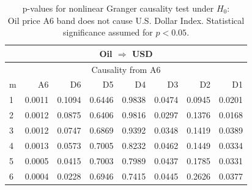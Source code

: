 %
%
\begin{table}[H]
\begin{center}
\begin{tabular}{l|r r r r r r r}
\hline\hline
\multicolumn{8}{c}{Oil $\Rightarrow$ USD}\\
\hline
\multicolumn{8}{c}{Causality from A6}\\
\hline\hline
m & A6 & D6 & D5 & D4 & D3 & D2 & D1 \\
\hline
1 & \cellcolor{mygrey}0.0011 & 0.1094 & 0.6446 & 0.9838 & \cellcolor{mygrey}0.0474 & 0.0945 & \cellcolor{mygrey}0.0201 \\
2 & \cellcolor{mygrey}0.0012 & 0.0875 & 0.6406 & 0.9816 & \cellcolor{mygrey}0.0297 & 0.1376 & \cellcolor{mygrey}0.0168 \\
3 & \cellcolor{mygrey}0.0012 & 0.0747 & 0.6869 & 0.9392 & \cellcolor{mygrey}0.0348 & 0.1419 & \cellcolor{mygrey}0.0389 \\
4 & \cellcolor{mygrey}0.0013 & 0.0573 & 0.7005 & 0.8232 & \cellcolor{mygrey}0.0462 & 0.1449 & \cellcolor{mygrey}0.0334 \\
5 & \cellcolor{mygrey}0.0005 & \cellcolor{mygrey}0.0415 & 0.7003 & 0.7989 & \cellcolor{mygrey}0.0437 & 0.1785 & \cellcolor{mygrey}0.0331 \\
6 & \cellcolor{mygrey}0.0004 & \cellcolor{mygrey}0.0228 & 0.6946 & 0.7415 & \cellcolor{mygrey}0.0445 & 0.2626 & \cellcolor{mygrey}0.0377 \\
\hline\hline
\end{tabular}
\caption{p-values for nonlinear Granger causality test under $H_0$:\\
Oil price A6 band does not cause U.S. Dollar Index. Statistical significance assumed for $p<0.05$.}
\end{center}
\end{table}

